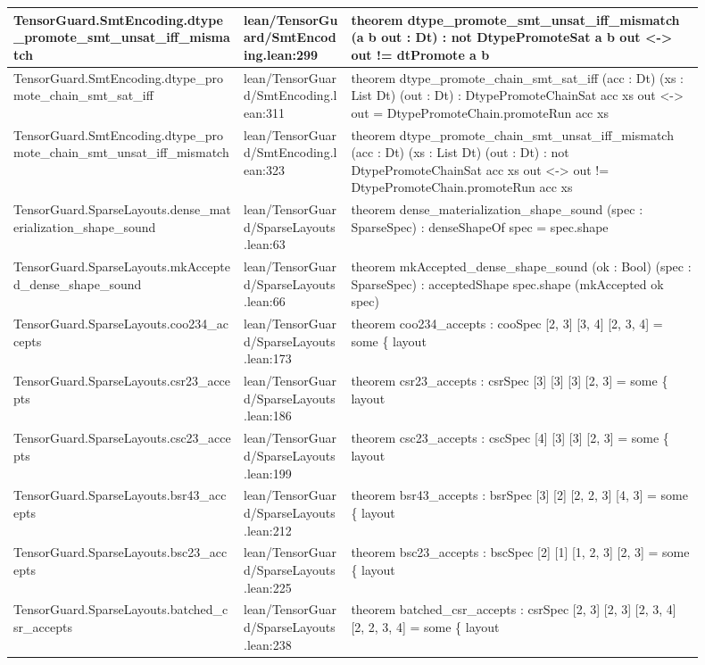 \documentclass[10pt]{article}
\begin{document}
\begin{longtable}{|p{0.30\linewidth}|p{0.14\linewidth}|p{0.46\linewidth}|}
\hline
TensorGuard.SmtEncoding.dtype\_promote\_smt\_unsat\_iff\_mismatch & lean/TensorGuard/SmtEncoding.lean:299 & theorem dtype\_promote\_smt\_unsat\_iff\_mismatch (a b out : Dt) : not  DtypePromoteSat a b out <-> out != dtPromote a b \\
\hline
TensorGuard.SmtEncoding.dtype\_promote\_chain\_smt\_sat\_iff & lean/TensorGuard/SmtEncoding.lean:311 & theorem dtype\_promote\_chain\_smt\_sat\_iff (acc : Dt) (xs : List Dt) (out : Dt) : DtypePromoteChainSat acc xs out <-> out = DtypePromoteChain.promoteRun acc xs \\
\hline
TensorGuard.SmtEncoding.dtype\_promote\_chain\_smt\_unsat\_iff\_mismatch & lean/TensorGuard/SmtEncoding.lean:323 & theorem dtype\_promote\_chain\_smt\_unsat\_iff\_mismatch (acc : Dt) (xs : List Dt) (out : Dt) : not  DtypePromoteChainSat acc xs out <-> out != DtypePromoteChain.promoteRun acc xs \\
\hline
TensorGuard.SparseLayouts.dense\_materialization\_shape\_sound & lean/TensorGuard/SparseLayouts.lean:63 & theorem dense\_materialization\_shape\_sound (spec : SparseSpec) : denseShapeOf spec = spec.shape \\
\hline
TensorGuard.SparseLayouts.mkAccepted\_dense\_shape\_sound & lean/TensorGuard/SparseLayouts.lean:66 & theorem mkAccepted\_dense\_shape\_sound (ok : Bool) (spec : SparseSpec) : acceptedShape spec.shape (mkAccepted ok spec) \\
\hline
TensorGuard.SparseLayouts.coo234\_accepts & lean/TensorGuard/SparseLayouts.lean:173 & theorem coo234\_accepts : cooSpec [2, 3] [3, 4] [2, 3, 4] = some \{ layout \\
\hline
TensorGuard.SparseLayouts.csr23\_accepts & lean/TensorGuard/SparseLayouts.lean:186 & theorem csr23\_accepts : csrSpec [3] [3] [3] [2, 3] = some \{ layout \\
\hline
TensorGuard.SparseLayouts.csc23\_accepts & lean/TensorGuard/SparseLayouts.lean:199 & theorem csc23\_accepts : cscSpec [4] [3] [3] [2, 3] = some \{ layout \\
\hline
TensorGuard.SparseLayouts.bsr43\_accepts & lean/TensorGuard/SparseLayouts.lean:212 & theorem bsr43\_accepts : bsrSpec [3] [2] [2, 2, 3] [4, 3] = some \{ layout \\
\hline
TensorGuard.SparseLayouts.bsc23\_accepts & lean/TensorGuard/SparseLayouts.lean:225 & theorem bsc23\_accepts : bscSpec [2] [1] [1, 2, 3] [2, 3] = some \{ layout \\
\hline
TensorGuard.SparseLayouts.batched\_csr\_accepts & lean/TensorGuard/SparseLayouts.lean:238 & theorem batched\_csr\_accepts : csrSpec [2, 3] [2, 3] [2, 3, 4] [2, 2, 3, 4] = some \{ layout \\

\end{longtable}
\end{document}
